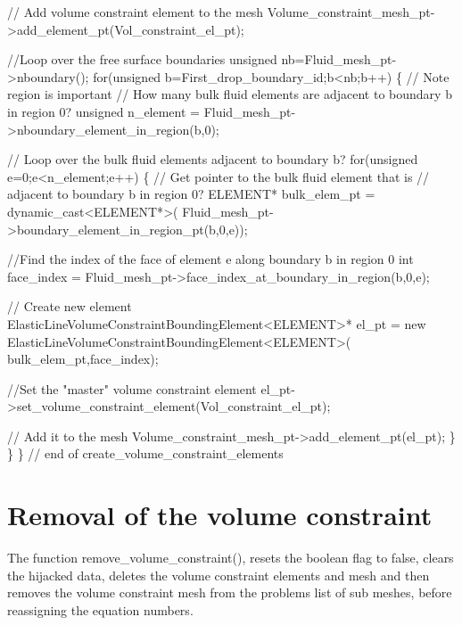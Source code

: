 \begin{DoxyCodeInclude}
 \textcolor{comment}{// Add volume constraint element to the mesh}
 Volume\_constraint\_mesh\_pt->add\_element\_pt(Vol\_constraint\_el\_pt);
 
 \textcolor{comment}{//Loop over the free surface boundaries}
 \textcolor{keywordtype}{unsigned} nb=Fluid\_mesh\_pt->nboundary();
 \textcolor{keywordflow}{for}(\textcolor{keywordtype}{unsigned} b=First\_drop\_boundary\_id;b<nb;b++)
  \{
   \textcolor{comment}{// Note region is important}
   \textcolor{comment}{// How many bulk fluid elements are adjacent to boundary b in region 0?}
   \textcolor{keywordtype}{unsigned} n\_element = Fluid\_mesh\_pt->nboundary\_element\_in\_region(b,0);
   
   \textcolor{comment}{// Loop over the bulk fluid elements adjacent to boundary b?}
   \textcolor{keywordflow}{for}(\textcolor{keywordtype}{unsigned} e=0;e<n\_element;e++)
    \{
     \textcolor{comment}{// Get pointer to the bulk fluid element that is }
     \textcolor{comment}{// adjacent to boundary b in region 0?}
     ELEMENT* bulk\_elem\_pt = \textcolor{keyword}{dynamic\_cast<}ELEMENT*\textcolor{keyword}{>}(
      Fluid\_mesh\_pt->boundary\_element\_in\_region\_pt(b,0,e));
     
     \textcolor{comment}{//Find the index of the face of element e along boundary b in region 0}
     \textcolor{keywordtype}{int} face\_index = Fluid\_mesh\_pt->face\_index\_at\_boundary\_in\_region(b,0,e);
     
     \textcolor{comment}{// Create new element}
     ElasticLineVolumeConstraintBoundingElement<ELEMENT>* el\_pt =
      \textcolor{keyword}{new} ElasticLineVolumeConstraintBoundingElement<ELEMENT>(
       bulk\_elem\_pt,face\_index);   
     
     \textcolor{comment}{//Set the "master" volume constraint element}
     el\_pt->set\_volume\_constraint\_element(Vol\_constraint\_el\_pt);
     
     \textcolor{comment}{// Add it to the mesh}
     Volume\_constraint\_mesh\_pt->add\_element\_pt(el\_pt);     
    \} 
  \}
\}
\textcolor{comment}{// end of create\_volume\_constraint\_elements}

\end{DoxyCodeInclude}




 

\hypertarget{index_remove}{}\section{Removal of the volume constraint}\label{index_remove}
The function {\ttfamily remove\+\_\+volume\+\_\+constraint()}, resets the boolean flag to false, clears the hijacked data, deletes the volume constraint elements and mesh and then removes the volume constraint mesh from the problem\textquotesingle{}s list of sub meshes, before reassigning the equation numbers.

